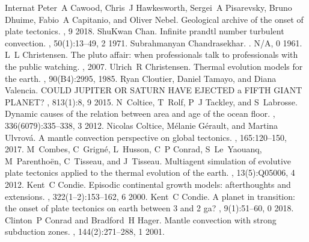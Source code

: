 \documentclass[letterpaper,10pt,english]{jupyterBook}
\begin{document}
\begin{sphinxthebibliography}{Internat}
\sphinxAtStartPar
Peter A Cawood, Chris J Hawkesworth, Sergei A Pisarevsky, Bruno Dhuime, Fabio A Capitanio, and Oliver Nebel. Geological archive of the onset of plate tectonics. , 9 2018.
\sphinxAtStartPar
Shu\sphinxhyphen{}Kwan Chan. Infinite prandtl number turbulent convection. , 50(1):13–49, 2 1971.
\sphinxAtStartPar
Subrahmanyan Chandrasekhar. . N/A, 0 1961.
\sphinxAtStartPar
L L Christensen. The pluto affair: when professionals talk to professionals with the public watching. , 2007.
\sphinxAtStartPar
Ulrich R Christensen. Thermal evolution models for the earth. , 90(B4):2995, 1985.
\sphinxAtStartPar
Ryan Cloutier, Daniel Tamayo, and Diana Valencia. COULD JUPITER OR SATURN HAVE EJECTED a FIFTH GIANT PLANET? , 813(1):8, 9 2015.
\sphinxAtStartPar
N Coltice, T Rolf, P J Tackley, and S Labrosse. Dynamic causes of the relation between area and age of the ocean floor. , 336(6079):335–338, 3 2012.
\sphinxAtStartPar
Nicolas Coltice, Mélanie Gérault, and Martina Ulvrová. A mantle convection perspective on global tectonics. , 165:120–150, 2017.
\sphinxAtStartPar
M Combes, C Grigné, L Husson, C P Conrad, S Le Yaouanq, M Parenthoën, C Tisseau, and J Tisseau. Multiagent simulation of evolutive plate tectonics applied to the thermal evolution of the earth. , 13(5):Q05006, 4 2012.
\sphinxAtStartPar
Kent C Condie. Episodic continental growth models: afterthoughts and extensions. , 322(1–2):153–162, 6 2000.
\sphinxAtStartPar
Kent C Condie. A planet in transition: the onset of plate tectonics on earth between 3 and 2 ga? , 9(1):51–60, 0 2018.
\sphinxAtStartPar
Clinton P Conrad and Bradford H Hager. Mantle convection with strong subduction zones. , 144(2):271–288, 1 2001.

\end{sphinxthebibliography}
\end{document}
